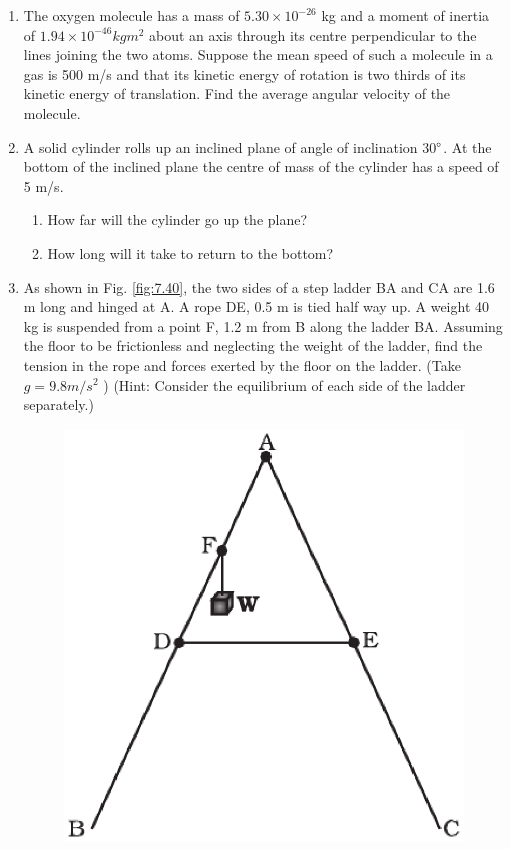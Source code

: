 \begin{enumerate}[label=\arabic*.,ref=\thesubsection.\theenumi]
\item  The oxygen molecule has a mass of $5.30  \times  10^{-26} $ kg and a moment of inertia of
$1.94 \times 10^{-46} kg m^2$ about an axis through its centre perpendicular to the lines joining
the two atoms. Suppose the mean speed of such a molecule in a gas is 500 m/s and that its kinetic energy of rotation is two thirds of its kinetic energy of translation. Find the average angular velocity of the molecule.
\item  A solid cylinder rolls up an inclined plane of angle of inclination 30$\degree$. At the bottom of the inclined plane the centre of mass of the cylinder has a speed of 5 m/s. 
\begin{enumerate}[label=(\alph*)]
\item How far will the cylinder go up the plane? 
\item  How long will it take to return to the bottom?
\end{enumerate}
\item  As shown in Fig. \ref{fig:7.40}, the two sides of a step ladder BA and CA are 1.6 m long and hinged at A. A rope DE, 0.5 m is tied half way up. A weight 40 kg is suspended from a point F, 1.2 m from B along the ladder BA. Assuming the floor to be frictionless and neglecting the weight of the ladder, find the tension in the rope and forces exerted by the floor on the ladder. (Take $g = 9.8 m/s^2$
) (Hint: Consider the equilibrium of each side of the ladder separately.) 
\begin{figure}[!ht]
\includegraphics[width=\columnwidth]{./figs/11-1/7/7.40.eps}

\end{figure}
\end{enumerate}
